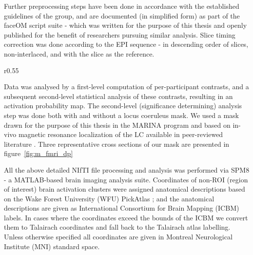 	    Further preprocessing steps have been done in accordance with the established guidelines of the group, and are documented (in simplified form) as part of the faceOM script suite \citep{faceOM} - which was written for the purpose of this thesis and openly published for the benefit of researchers pursuing similar analysis.
	    Slice timing correction was done according to the EPI sequence - in descending order of slices, non-interlaced, and with the  slice as the reference.
	    
	    \begin{wrapfigure}{r}{0.55\textwidth}
		\centering
		\vspace{-0.5cm}
		\caption{Mask for the LC based on MNI coordinates extracted from in-vivo MRI localization \citep{Keren2009}. The mask was smoothed and the dynamic range remapped to [-1;1].}
		\label{fig:m_fmri_dp}
		\vspace{-1.0cm}
	    \end{wrapfigure}
	    
	    Data was analysed by a first-level computation of per-participant contrasts, and a subsequent second-level statistical analysis of these contrasts, resulting in an activation probability map.
	    The second-level (significance determining) analysis step was done both with and without a locus coeruleus mask.
	    We used a mask drawn for the purpose of this thesis in the MARINA program \citep{Walter2003} and based on in-vivo magnetic resonance localization of the LC available in peer-reviewed literature \citep{Keren2009}.
	    Three representative cross sections of our mask are presented in figure~\ref{fig:m_fmri_dp}
		
	    All the above detailed NIfTI file processing and analysis was performed via SPM8 \citep{spm} - a MATLAB\textsuperscript{\small\textregistered}-based brain imaging analysis suite.
	    Coordinates of non-ROI (region of interest) brain activation clusters were assigned anatomical descriptions based on the Wake Forest University (WFU) PickAtlas \citep{Maldjian2003}; 
	    and the anatomical descriptions are given as International Consortium for Brain Mapping (ICBM) labels.
	    In cases where the coordinates exceed the bounds of the ICBM we convert them to Talairach coordinates and fall back to the Talairach atlas labelling.
	    Unless otherwise specified all coordinates are given in Montreal Neurological Institute (MNI) standard space.
	    
